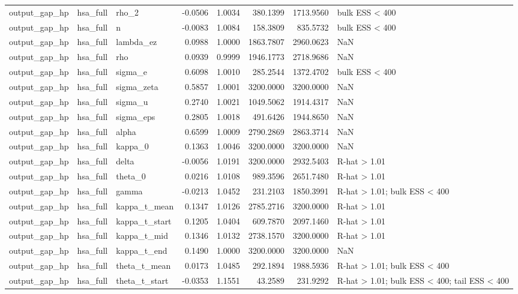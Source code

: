 \begin{tabular}{lllrrrrl}
output\_gap\_hp & hsa\_full & rho\_2 & -0.0506 & 1.0034 & 380.1399 & 1713.9560 & bulk ESS < 400 \\
output\_gap\_hp & hsa\_full & n & -0.0083 & 1.0084 & 158.3809 & 835.5732 & bulk ESS < 400 \\
output\_gap\_hp & hsa\_full & lambda\_ez & 0.0988 & 1.0000 & 1863.7807 & 2960.0623 & NaN \\
output\_gap\_hp & hsa\_full & rho & 0.0939 & 0.9999 & 1946.1773 & 2718.9686 & NaN \\
output\_gap\_hp & hsa\_full & sigma\_e & 0.6098 & 1.0010 & 285.2544 & 1372.4702 & bulk ESS < 400 \\
output\_gap\_hp & hsa\_full & sigma\_zeta & 0.5857 & 1.0001 & 3200.0000 & 3200.0000 & NaN \\
output\_gap\_hp & hsa\_full & sigma\_u & 0.2740 & 1.0021 & 1049.5062 & 1914.4317 & NaN \\
output\_gap\_hp & hsa\_full & sigma\_eps & 0.2805 & 1.0018 & 491.6426 & 1944.8650 & NaN \\
output\_gap\_hp & hsa\_full & alpha & 0.6599 & 1.0009 & 2790.2869 & 2863.3714 & NaN \\
output\_gap\_hp & hsa\_full & kappa\_0 & 0.1363 & 1.0046 & 3200.0000 & 3200.0000 & NaN \\
output\_gap\_hp & hsa\_full & delta & -0.0056 & 1.0191 & 3200.0000 & 2932.5403 & R-hat > 1.01 \\
output\_gap\_hp & hsa\_full & theta\_0 & 0.0216 & 1.0108 & 989.3596 & 2651.7480 & R-hat > 1.01 \\
output\_gap\_hp & hsa\_full & gamma & -0.0213 & 1.0452 & 231.2103 & 1850.3991 & R-hat > 1.01; bulk ESS < 400 \\
output\_gap\_hp & hsa\_full & kappa\_t\_mean & 0.1347 & 1.0126 & 2785.2716 & 3200.0000 & R-hat > 1.01 \\
output\_gap\_hp & hsa\_full & kappa\_t\_start & 0.1205 & 1.0404 & 609.7870 & 2097.1460 & R-hat > 1.01 \\
output\_gap\_hp & hsa\_full & kappa\_t\_mid & 0.1346 & 1.0132 & 2738.1570 & 3200.0000 & R-hat > 1.01 \\
output\_gap\_hp & hsa\_full & kappa\_t\_end & 0.1490 & 1.0000 & 3200.0000 & 3200.0000 & NaN \\
output\_gap\_hp & hsa\_full & theta\_t\_mean & 0.0173 & 1.0485 & 292.1894 & 1988.5936 & R-hat > 1.01; bulk ESS < 400 \\
output\_gap\_hp & hsa\_full & theta\_t\_start & -0.0353 & 1.1551 & 43.2589 & 231.9292 & R-hat > 1.01; bulk ESS < 400; tail ESS < 400 \\

\end{tabular}
